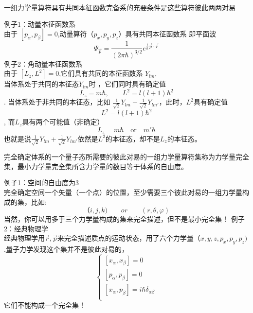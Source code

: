 \begin{frame} [allowframebreaks=]
    \begin{tcolorbox}[colback=yellow!5,colframe=yellow!75!black,title=推论1：]
        一组力学量算符具有共同本征函数完备系的充要条件是这些算符彼此两两对易
    \end{tcolorbox}
    \alert{例子1：动量本征函数系} \\
    由于 $[p_\alpha,p_\beta]=0$,动量算符（$p_x, p_y, p_z$）具有共同本征函数系 即平面波\\
    $$ \Psi_{\vec p}= \frac{1}{(2\pi\hbar)^{3/2}} e^{\frac{i}{\hbar}\vec{p}\cdot\vec{r}}$$ 
    \alert{例子2：角动量本征函数系} \\
    由于 $[L_z,L^2]=0$,它们具有共同的本征函数系 {$Y_{lm}$},\\
    当体系处于共同的本征态$Y_{lm}$时 ，它们同时具有确定值
    $$L_z= m\hbar, \qquad L^2=l(l+1)\hbar ^2 $$.
    当体系处于非共同的本征态，比如 $\frac{1}{\sqrt{2}}Y_{lm} + \frac{1}{\sqrt{2}}Y_{lm'}$，此时，$L^2$具有确定值
    $$L^2=l(l+1)\hbar ^2 $$,
    而$L_z$具有两个可能值（非确定）
    $$L_z= m\hbar\quad \text{or} \quad m'\hbar$$
    也就是说$\frac{1}{\sqrt{2}}Y_{lm} + \frac{1}{\sqrt{2}}Y_{lm'}$依然是$L^2$的本征态，却不是$L_z$的本征态。
\end{frame} 

\begin{frame} [allowframebreaks=]
    \begin{tcolorbox}[colback=yellow!5,colframe=yellow!75!black,title=推论2：]
        完全确定体系的一个量子态所需要的彼此对易的一组力学量算符集称为力学量完全集，最小力学量完全集所含力学量的数目等于体系的自由度。
    \end{tcolorbox}
    \alert{例子1：空间的自由度为3} \\
    完全确定空间一个矢量（一个点）的位置，至少需要三个彼此对易的一组力学量构成的集，比如: $$（i,j,k) \qquad or \qquad (r,\theta,\varphi) $$
    当然，你可以用多于三个力学量构成的集来完全描述，但不是最小完全集！
    \alert{例子2：经典物理学} \\
    经典物理学用$\vec{r}, \vec{p}$来完全描述质点的运动状态，用了六个力学量$（x,y,z, p_x, p_y, p_z)$,量子力学发现这个集并不是彼此对易的，
    $$\begin{cases}
        [x_\alpha,x_\beta]= 0  \\ 
        [p_\alpha,p_\beta]= 0  \\ 
        [x_\alpha,p_\beta]= i\hbar \delta_{\alpha\beta}  \\ 
    \end{cases}$$
    它们不能构成一个完全集！
\end{frame} 

